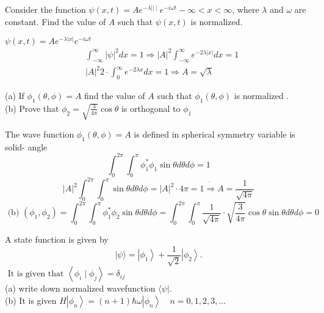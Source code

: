 \begin{enumerate}
	\begin{minipage}{\textwidth}
	\item Consider the function $\psi(x, t)=A e^{-\lambda|| \mid} e^{-i \omega t}-\infty<x<\infty$, where $\lambda$ and $\omega$ are constant. Find the value of $A$ such that $\psi(x, t)$ is normalized.
\end{minipage}
\begin{answer}
	$\psi(x, t)=A e^{-\lambda|x|} e^{-i \omega t}$\\
	\begin{align*}
		&\int_{-\infty}^{\infty}|\psi|^{2} d x=1 \Rightarrow|A|^{2} \int_{-\infty}^{\infty} e^{-2 \lambda|x|} d x=1 \\
		&|A|^{2} 2 \cdot \int_{0}^{\infty} e^{-2 \lambda x} d x=1 \Rightarrow A=\sqrt{\lambda}
	\end{align*}
\end{answer}
	\begin{minipage}{\textwidth}
	\item (a) If $\phi_{1}(\theta, \phi)=A$ find the value of $A$ such that $\phi_{1}(\theta, \phi)$ is normalized .\\
	(b) Prove that $\phi_{2}=\sqrt{\frac{3}{4 \pi}} \cos \theta$ is orthogonal to $\phi_{1}$
\end{minipage}
\begin{answer}
 The wave function $\phi_{1}(\theta, \phi)=A$ is defined in spherical symmetry variable is solid- angle\\
 $$\int_{0}^{2 \pi } \int_{0}^{\pi} \phi_{1}^* \phi_{1} \sin \theta d \theta d \phi=1$$
 $$|A|^{2} \int_{0}^{2 \pi} \int_{0}^{\pi} \sin \theta d \theta d \phi=|A|^{2} \cdot 4 \pi=1 \dot{\Rightarrow} A=\frac{1}{\sqrt{4 \pi}}$$
 $$\text { (b) }\left(\phi_{1}, \phi_{2}\right)=\int_{0}^{2 \pi} \int_{0}^{\pi} \phi_{1}^{*} \phi_{2} \sin \theta d \theta d \phi=\int_{0}^{2 \pi} \int_{0}^{\pi} \frac{1}{\sqrt{4 \pi}} \cdot \sqrt{\frac{3}{4 \pi}} \cos \theta \sin \theta d \theta d \phi=0$$
\end{answer}
	\begin{minipage}{\textwidth}
	\item A state function is given by
	$$
	|\psi\rangle=\left|\phi_{1}\right\rangle+\frac{1}{\sqrt{2}}\left|\phi_{2}\right\rangle .
	$$
	$\text { It is given that }\left\langle\phi_{i} \mid \phi_{j}\right\rangle=\delta_{i j}$\\
	(a) write down normalized wavefunction $\langle\psi|$.\\
	(b) It is given $H\left|\phi_{n}\right\rangle=(n+1) \hbar \omega\left|\phi_{n}\right\rangle \quad n=0,1,2,3, \ldots$\\

\end{minipage}
\end{enumerate}
